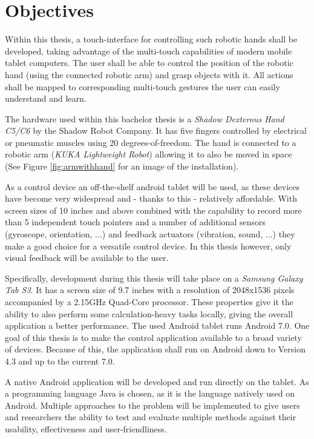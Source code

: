 \section{Objectives}

Within this thesis, a touch-interface for controlling such robotic hands shall be developed, taking advantage of the multi-touch capabilities of modern mobile tablet computers. The user shall be able to control the position of the robotic hand (using the connected robotic arm) and grasp objects with it. All actions shall be mapped to corresponding multi-touch gestures the user can easily understand and learn.

The hardware used within this bachelor thesis is a \textit{Shadow Dexterous Hand C5/C6} by the Shadow Robot Company. It has five fingers controlled by electrical or pneumatic muscles using 20 degrees-of-freedom\cite{web:robothand:spec}. The hand is connected to a robotic arm (\textit{KUKA Lightweight Robot}) allowing it to also be moved in space (See Figure \ref{fig:armwithhand} for an image of the installation).

As a control device an off-the-shelf android tablet will be used, as these devices have become very widespread and - thanks to this - relatively affordable. With screen sizes of 10 inches and above combined with the capability to record more than 5 independent touch pointers and a number of additional sensors (gyroscope, orientation, ...) and feedback actuators (vibration, sound, ...) they make a good choice for a versatile control device. In this thesis however, only visual feedback will be available to the user.

Specifically, development during this thesis will take place on a \textit{Samsung Galaxy Tab S3}. It has a screen size of 9.7 inches\cite{samsung:galaxytabs3} with a resolution of 2048x1536 pixels accompanied by a 2.15GHz Quad-Core processor. These properties give it the ability to also perform some calculation-heavy tasks locally, giving the overall application a better performance. The used Android tablet runs Android 7.0. One goal of this thesis is to make the control application available to a broad variety of devices. Because of this, the application shall run on Android down to Version 4.3 and up to the current 7.0.

A native Android application will be developed and run directly on the tablet. As a programming language Java is chosen, as it is the language natively used on Android. Multiple approaches to the problem will be implemented to give users and researchers the ability to test and evaluate multiple methods against their usability, effectiveness and user-friendliness.

